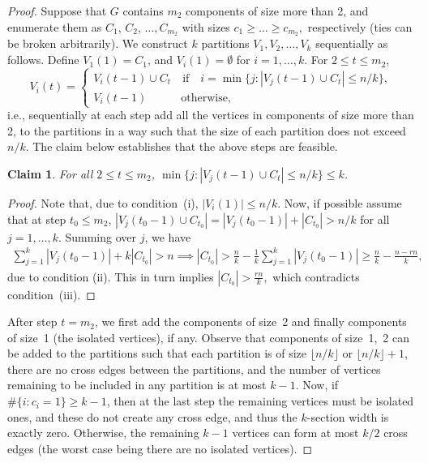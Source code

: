 \documentclass[11pt,a4paper, reqno]{article}
\numberwithin{equation}{section}
\numberwithin{equation}{section}
\newcommand{\1}{\ensuremath{\mathbbm{1}}}
\newtheorem{claim}{Claim}
\newenvironment{claimproof}{\begin{proof}\renewcommand{\qedsymbol}{\claimqed}}{\end{proof}\renewcommand{\qedsymbol}{\plainqed}}
\let\plainqed\qedsymbol
\newcommand{\claimqed}{$\lrcorner$}
\numberwithin{equation}{section}
\numberwithin{theorem}{section}
\begin{document}
\begin{proof}
Suppose that  $G$ contains $m_{ 2}$ components of size more than 2, and
enumerate them as $C_1$, $C_2$, $\ldots, C_{m_{2}}$ with sizes $c_1\geq \dots\geq c_{m_2},$ respectively (ties can be broken arbitrarily).
We construct $k$ partitions $V_1, V_2,\ldots, V_k$ sequentially as follows.
Define $V_1(1)=C_1$, and $V_i(1)=\emptyset$ for $i=1,\ldots,k$. 
For $2\leq t\leq m_2$,
$$V_i(t) = 
\begin{cases}
V_i(t-1)\cup C_t\quad\text{if}\quad i = \min\{j:|V_j(t-1)\cup C_t|\leq n/k\},\\
V_i(t-1)\quad\qquad\text{otherwise},
\end{cases}$$
i.e., sequentially at each step add all the vertices in components of size more than 2, to the partitions in a way such that the size of each partition does not exceed $n/k$.
The claim below establishes that the above steps are feasible.
\begin{claim}
For all $2\leq t\leq m_2$, $\min\{j:|V_j(t-1)\cup C_t|\leq n/k\}\leq k$.
\end{claim}
\begin{claimproof}
Note that, due to condition~(i), $|V_i(1)|\leq n/k$.
Now, if possible assume that at step $t_0\leq m_2$, $|V_j(t_0-1)\cup C_{t_0}|= |V_j(t_0-1)|+| C_{t_0}|>n/k$ for all $j=1,\ldots,k$.
Summing over $j$, we have 
\begin{align*}
\sum_{j=1}^k|V_j(t_0-1)|+k| C_{t_0}|>n
\implies  | C_{t_0}|>\frac{n}{k}-\frac{1}{k}\sum_{j=1}^k|V_j(t_0-1)|\geq \frac{n}{k} - \frac{n-rn}{k},
\end{align*}
due to condition (ii). This in turn implies $|C_{t_0}|>\frac{rn}{k},$
which contradicts condition~(iii).
\end{claimproof}  
After step $t=m_2$, we first add the components of size~2 and finally components of size~1 (the isolated vertices), if any.
Observe that  components of size~1,~2 can be added to the partitions such that each partition is of size $\lfloor n/k\rfloor$ or $\lfloor n/k\rfloor+1$, there are no cross edges between the partitions, and the number of vertices remaining to be included in any partition is at most $k-1$.
Now, if  $\#\{i:c_i = 1\} \geq k-1$, then at the last step
the remaining vertices must be isolated ones, and these do not create any cross edge, and thus the $k$-section width is exactly zero. 
Otherwise, the remaining $k-1$ vertices can form at most $k/2$ cross edges (the worst case being there are no isolated vertices).
\end{proof}
\end{document}
